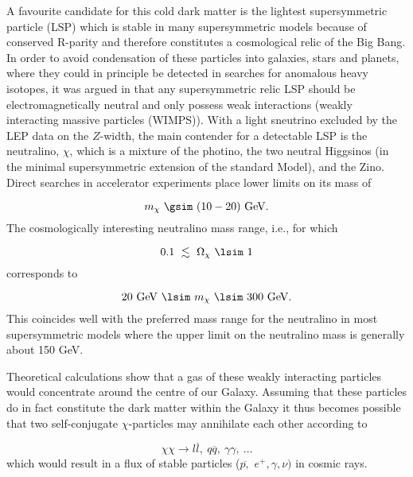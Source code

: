 A favourite candidate for this cold dark matter is the lightest
supersymmetric particle (LSP) which is stable in many supersymmetric models
because of conserved R-parity and therefore constitutes a cosmological relic
of the Big Bang. In order to avoid condensation of these particles into
galaxies, stars and planets, where they could in principle be detected in
searches for anomalous heavy isotopes, it was argued in \cite{ellis:84} that any
supersymmetric relic LSP should be electromagnetically neutral and only
possess weak interactions (weakly interacting massive particles (WIMPS)).
With a light sneutrino excluded by the LEP data on the $Z$-width, the main
contender for a detectable LSP is the neutralino, $\chi $, which is a
mixture of the photino, the two neutral Higgsinos (in the minimal
supersymmetric extension of the standard Model), and the Zino. Direct
searches in accelerator experiments place lower limits on its mass of

\[
m_{\chi }\ \gsim\ (10 - 20)\ \mathrm{ GeV}. 
\]
The cosmologically interesting neutralino mass range, i.e., for which

\[
0.1 \ \lesssim \  \Omega _{\chi }\ \lsim\ 1 
\]
corresponds to

\[
20 \ \mathrm{ GeV}\  \lsim \  m_{\chi } \  \lsim \ 300 \ \mathrm{ GeV.} 
\]
This coincides well with the preferred mass range for the neutralino in most
supersymmetric models where the upper limit on the neutralino mass is
generally about 150 GeV.

Theoretical calculations show that a gas of these weakly interacting
particles would concentrate around the centre of our Galaxy. Assuming that
these particles do in fact constitute the dark matter within the Galaxy it
thus becomes possible that two self-conjugate $\chi $-particles may
annihilate each other according to

\[
\chi \chi \rightarrow l\overline{l},\ \mathrm{ }q\overline{q},\ \gamma \gamma
,\ \ldots 
\]
which would result in a flux of stable particles ($\overline{p\mathrm{,}}$ $%
e^{+},\gamma ,\nu )$ in cosmic rays.

